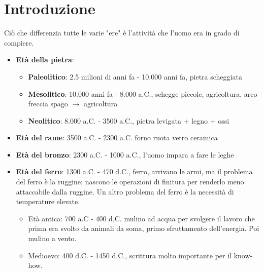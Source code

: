 \documentclass[../main.tex]{subfiles}
\begin{document}
\section{Introduzione}
Ciò che differenzia tutte le varie "ere" è l'attività che l'uomo era in grado di compiere.
\begin{itemize}
    \item \textbf{Età della pietra}:
    \begin{itemize}
        \item \textbf{Paleolitico}: 2.5 milioni di anni fa - 10.000 anni fa, pietra scheggiata 
        \item \textbf{Mesolitico}: 10.000 anni fa - 8.000 a.C., schegge piccole, agricoltura, arco freccia spago $\rightarrow$ agricoltura
        \item \textbf{Neolitico}: 8.000 a.C. - 3500 a.C., pietra levigata + legno + ossi
    \end{itemize}
    \item \textbf{Età del rame}: 3500 a.C. - 2300 a.C. forno ruota vetro ceramica
    \item \textbf{Età del bronzo}: 2300 a.C. - 1000 a.C., l'uomo impara a fare le leghe
    \item \textbf{Età del ferro}: 1300 a.C. - 470 d.C., ferro, arrivano le armi, ma il problema del ferro è la ruggine: nascono le operazioni di finitura per renderlo meno attaccabile dalla ruggine. Un altro problema del ferro è la necessità di temperature elevate.
    \begin{itemize}
        \item Età antica: 700 a.C - 400 d.C. mulino ad acqua per svolgere il lavoro che prima era svolto da animali da soma, primo sfruttamento dell'energia. Poi mulino a vento.
        \item Medioevo: 400 d.C. - 1450 d.C., scrittura molto importante per il know-how.
    \end{itemize}
\end{itemize}
\end{document}

